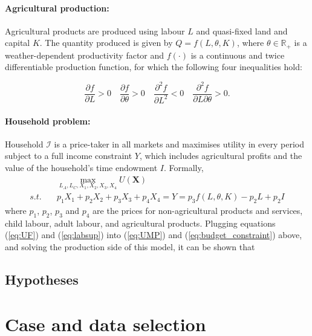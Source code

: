 \documentclass[a4paper,12pt]{article}
\theoremstyle{plain}
\theoremstyle{definition}
\theoremstyle{definition}
\theoremstyle{definition}
\theoremstyle{definition}
\begin{document}
\paragraph{Agricultural production:}
Agricultural products are produced using labour $L$ and quasi-fixed land and capital $K$. The quantity produced is given by $Q=f(L,\theta,K)$, where $\theta \in\mathbb{R}_+$ is a weather-dependent productivity factor and $f(\cdot)$ is a continuous and twice differentiable production function, for which the following four inequalities hold:

$$\frac{\partial f}{\partial L}>0 \quad \frac{\partial f}{\partial \theta}>0 \quad \frac{\partial^2 f}{\partial L^2}<0 \quad \frac{\partial^2 f}{\partial L \partial \theta}>0.$$

\paragraph{Household problem:}

Household $\mathcal{I}$ is a price-taker in all markets and maximises utility in every period subject to a full income constraint $Y$, which includes agricultural profits and the value of the household's time endowment $I$. Formally,
\begin{align}
\label{eq:UMP}
    &\max_{L_A, L_C,X_1, X_2, X_3, X_4} U(\mathbf{X})\\ 
\label{eq:budget_constraint}
    s.t.\quad& p_1 X_1 + p_2 X_2 + p_3 X_3 +p_4 X_4 = Y=p_3 f(L,\theta,K)-p_2L+p_2I
\end{align}
where $p_1$, $p_2$, $p_3$ and $p_4$ are the prices for non-agricultural products and services, child labour, adult labour, and agricultural products. Plugging equations (\ref{eq:UF}) and (\ref{eq:labsup}) into (\ref{eq:UMP}) and (\ref{eq:budget_constraint}) above, and solving the production side of this model, it can be shown that





\subsection{Hypotheses}

\section{Case and data selection}
\label{sec:case_selection}
\end{document}
